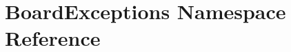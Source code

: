 \hypertarget{namespaceBoardExceptions}{}\section{Board\+Exceptions Namespace Reference}
\label{namespaceBoardExceptions}
